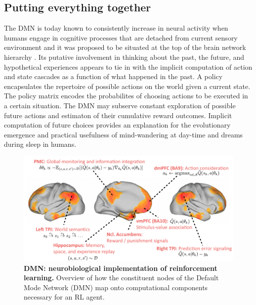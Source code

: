 \documentclass[10pt,letterpaper]{article}
\begin{document}
\subsection{Putting everything together}
The DMN is today known to consistently increase in neural
  activity when humans engage in cognitive processes that are detached from
  current sensory environment
  \citep{kenet2003spontaneously, fiser2004small, bzdok2013segregation}
  and it was proposed to be situated at the top of the brain network hierarchy
  \citep{carhart2010default, margulies2016situating}.
  Its putative involvement in thinking about the past,
  the future, and hypothetical experiences
  appears to tie in with the implicit computation of
  action and state cascades as a function of what happened in the past.
  A policy encapsulates the repertoire of possible actions
    on the world given a current state.
    The policy matrix encodes the probabilites of
    choosing actions to be executed in a certain situation.
The DMN may subserve
  constant exploration of possible future actions and estimaton of their
  cumulative reward outcomes. Implicit computation of future choices
  provides an explanation for the
  evolutionary emergence and practical usefulness of
  mind-wandering at day-time and dreams during sleep
  in humans.
\begin{figure}[!h]
  \includegraphics[width=.9\linewidth]{neurobiological_and_rl_overview_DMN.pdf}
  \caption{\textbf{DMN: neurobiological implementation of reinforcement learning.}
  Overview of how the constituent nodes of the Default Mode Network (DMN)
  map onto computational components necessary for an RL agent.}
  \label{fig:rl_process_chart}
\end{figure}
\end{document}
